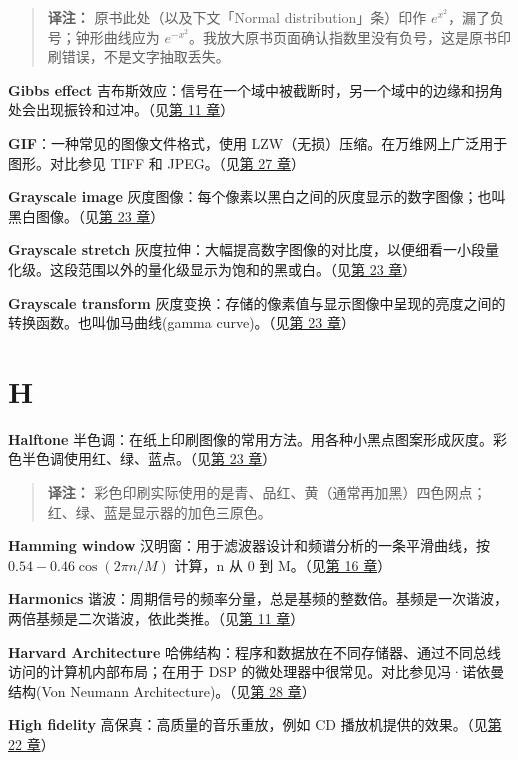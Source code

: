 \begin{quote}
\textbf{译注：} 原书此处（以及下文「Normal distribution」条）印作
\(e^{x^2}\)，漏了负号；钟形曲线应为
\(e^{-x^2}\)。我放大原书页面确认指数里没有负号，这是原书印刷错误，不是文字抽取丢失。
\end{quote}

\textbf{Gibbs effect}
吉布斯效应：信号在一个域中被截断时，另一个域中的边缘和拐角处会出现振铃和过冲。（见\hyperref[ch-11]{第
11 章}）

\textbf{GIF}：一种常见的图像文件格式，使用
LZW（无损）压缩。在万维网上广泛用于图形。对比参见 TIFF 和
JPEG。（见\hyperref[ch-27]{第 27 章}）

\textbf{Grayscale image}
灰度图像：每个像素以黑白之间的灰度显示的数字图像；也叫黑白图像。（见\hyperref[ch-23]{第
23 章}）

\textbf{Grayscale stretch}
灰度拉伸：大幅提高数字图像的对比度，以便细看一小段量化级。这段范围以外的量化级显示为饱和的黑或白。（见\hyperref[ch-23]{第
23 章}）

\textbf{Grayscale transform}
灰度变换：存储的像素值与显示图像中呈现的亮度之间的转换函数。也叫伽马曲线(gamma
curve)。（见\hyperref[ch-23]{第 23 章}）

\section{H}

\textbf{Halftone}
半色调：在纸上印刷图像的常用方法。用各种小黑点图案形成灰度。彩色半色调使用红、绿、蓝点。（见\hyperref[ch-23]{第
23 章}）

\begin{quote}
\textbf{译注：}
彩色印刷实际使用的是青、品红、黄（通常再加黑）四色网点；红、绿、蓝是显示器的加色三原色。
\end{quote}

\textbf{Hamming window}
汉明窗：用于滤波器设计和频谱分析的一条平滑曲线，按
\(0.54 - 0.46\cos(2\pi n/M)\) 计算，n 从 0 到 M。（见\hyperref[ch-16]{第
16 章}）

\textbf{Harmonics}
谐波：周期信号的频率分量，总是基频的整数倍。基频是一次谐波，两倍基频是二次谐波，依此类推。（见\hyperref[ch-11]{第
11 章}）

\textbf{Harvard Architecture}
哈佛结构：程序和数据放在不同存储器、通过不同总线访问的计算机内部布局；在用于
DSP 的微处理器中很常见。对比参见冯·诺依曼结构(Von Neumann
Architecture)。（见\hyperref[ch-28]{第 28 章}）

\textbf{High fidelity} 高保真：高质量的音乐重放，例如 CD
播放机提供的效果。（见\hyperref[ch-22]{第 22 章}）

